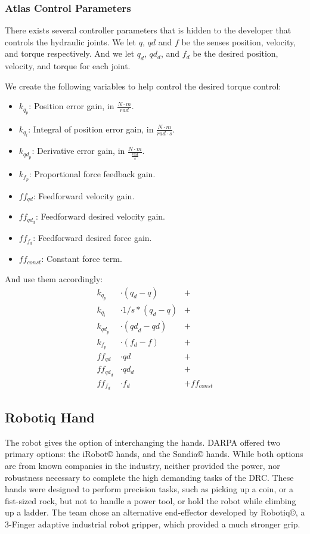 \documentclass[12pt]{report}
\begin{document}
\pagebreak


\subsubsection{Atlas Control Parameters}
There exists several controller parameters that is hidden to the developer that controls the hydraulic joints. We let $q$, $qd$ and $f$ be the senses position, velocity, and torque respectively. And we let $q_d$, $qd_d$, and $f_d$ be the desired position, velocity, and torque for each joint.

We create the following variables to help control the desired torque control:

\begin{itemize}
\item $k_{q_p}$: Position error gain, in $\frac{N \cdot m}{rad}$.
\item $k_{q_i} $: Integral of position error gain, in $\frac{N \cdot m}{rad \cdot s}$.
\item $k_{{qd}_p}$: Derivative error gain, in $\frac{N \cdot m}{\frac{rad}{s}}$.
\item $k_{f_p}$: Proportional force feedback gain.
\item ${ff}_{qd}$: Feedforward velocity gain.
\item ${ff}_{{qd}_d}$: Feedforward desired velocity gain.
\item ${ff}_{f_d}$: Feedforward desired force gain.
\item ${ff}_{const}$: Constant force term.
\end{itemize}

And use them accordingly: 
\begin{align*}
k_{q_p} &\cdot ( q_d - q ) &+\\
k_{q_i} &\cdot 1/s * ( q_d - q ) &+\\
k_{{qd}_p} &\cdot ( {qd}_d - qd ) &+\\
k_{f_p} &\cdot ( f_d - f ) &+\\
{ff}_{qd} &\cdot qd &+\\
{ff}_{{qd}_d} &\cdot qd_d &+\\
{ff}_{f_d} &\cdot f_d &+ {ff}_{const}
\end{align*}

\subsection{Robotiq Hand}

The robot gives the option of interchanging the hands. DARPA offered two primary options: the iRobot© hands, and the Sandia© hands. While both options are from known companies in the industry, neither provided the power, nor robustness necessary to complete the high demanding tasks of the DRC. These hands were designed to perform precision tasks, such as picking up a coin, or a fist-sized rock, but not to handle a power tool, or hold the robot while climbing up a ladder. The team chose an alternative end-effector developed by Robotiq©, a 3-Finger adaptive industrial robot gripper, which provided a much stronger grip. 
\end{document}
